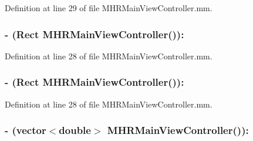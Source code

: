 Definition at line 29 of file M\+H\+R\+Main\+View\+Controller.\+mm.

\hypertarget{category_m_h_r_main_view_controller_07_08_a8e5e7cd7481bac3b8bf77d684976a283}{
\subsubsection[{R\+O\+I\+\_\+lower}]{\setlength{\rightskip}{0pt plus 5cm}-\/ (Rect {\bf M\+H\+R\+Main\+View\+Controller}())\+:\hspace{0.3cm}{\ttfamily [protected]}}}\label{category_m_h_r_main_view_controller_07_08_a8e5e7cd7481bac3b8bf77d684976a283}


Definition at line 28 of file M\+H\+R\+Main\+View\+Controller.\+mm.

\hypertarget{category_m_h_r_main_view_controller_07_08_a8ec78910220259631707236b9160c626}{
\subsubsection[{R\+O\+I\+\_\+upper}]{\setlength{\rightskip}{0pt plus 5cm}-\/ (Rect {\bf M\+H\+R\+Main\+View\+Controller}())\+:\hspace{0.3cm}{\ttfamily [protected]}}}\label{category_m_h_r_main_view_controller_07_08_a8ec78910220259631707236b9160c626}


Definition at line 28 of file M\+H\+R\+Main\+View\+Controller.\+mm.

\hypertarget{category_m_h_r_main_view_controller_07_08_abc8096634910dfbb9d748b376d8506cb}{
\subsubsection[{temporal\+\_\+mean}]{\setlength{\rightskip}{0pt plus 5cm}-\/ (vector$<$double$>$ {\bf M\+H\+R\+Main\+View\+Controller}())\+:\hspace{0.3cm}{\ttfamily [protected]}}}\label{category_m_h_r_main_view_controller_07_08_abc8096634910dfbb9d748b376d8506cb}


